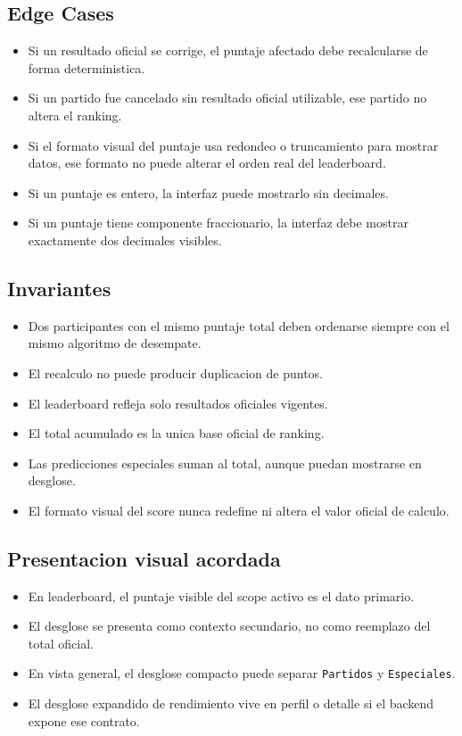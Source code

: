 \subsection{Edge Cases}

\begin{itemize}
  \item Si un resultado oficial se corrige, el puntaje afectado debe recalcularse de forma deterministica.
  \item Si un partido fue cancelado sin resultado oficial utilizable, ese partido no altera el ranking.
  \item Si el formato visual del puntaje usa redondeo o truncamiento para mostrar datos, ese formato no puede alterar el orden real del leaderboard.
  \item Si un puntaje es entero, la interfaz puede mostrarlo sin decimales.
  \item Si un puntaje tiene componente fraccionario, la interfaz debe mostrar exactamente dos decimales visibles.
\end{itemize}

\subsection{Invariantes}

\begin{itemize}
  \item Dos participantes con el mismo puntaje total deben ordenarse siempre con el mismo algoritmo de desempate.
  \item El recalculo no puede producir duplicacion de puntos.
  \item El leaderboard refleja solo resultados oficiales vigentes.
  \item El total acumulado es la unica base oficial de ranking.
  \item Las predicciones especiales suman al total, aunque puedan mostrarse en desglose.
  \item El formato visual del score nunca redefine ni altera el valor oficial de calculo.
\end{itemize}

\subsection{Presentacion visual acordada}

\begin{itemize}
  \item En leaderboard, el puntaje visible del scope activo es el dato primario.
  \item El desglose se presenta como contexto secundario, no como reemplazo del total oficial.
  \item En vista general, el desglose compacto puede separar \texttt{Partidos} y \texttt{Especiales}.
  \item El desglose expandido de rendimiento vive en perfil o detalle si el backend expone ese contrato.
\end{itemize}
